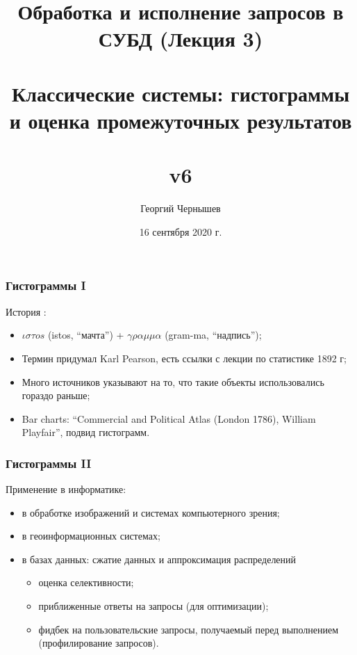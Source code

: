 \documentclass{beamer}
\title[Обработка и исполнение запросов: лекция 3]{Обработка и исполнение запросов в СУБД (Лекция 3) \\~\\ Классические системы: гистограммы и оценка промежуточных результатов\\~\\ v6} %
\author{Георгий Чернышев} %
\institute[ВШЭ] %
{
Высшая Школа Экономики \\ %
\medskip
\textit{chernishev@gmail.com} %
}
\date{16 сентября 2020 г.}
\begin{document}
\begin{frame}
\titlepage %
\end{frame}

\begin{frame}
\frametitle{Гистограммы I}

История \cite{Ioannidis2003}:
\begin{itemize}
  \setlength\itemsep{1em}
  \item $\iota \sigma \tau os$ (istos, ``мачта'') + $\gamma \rho \alpha \mu \mu \alpha$ (gram-ma, ``надпись'');
  \item Термин придумал Karl Pearson, есть ссылки с лекции по статистике 1892 г;
  \item Много источников указывают на то, что такие объекты использовались гораздо раньше;
  \item Bar charts: ``Commercial and Political Atlas (London 1786), William Playfair'', подвид гистограмм.
\end{itemize}

\end{frame}

\begin{frame}
\frametitle{Гистограммы II}

Применение в информатике:
\begin{itemize}
  \setlength\itemsep{1em}
  \item в обработке изображений и системах компьютерного зрения;
  \item в геоинформационных системах;
  \item в базах данных: сжатие данных и аппроксимация распределений
  \begin{itemize}
    \item оценка селективности;
    \item приближенные ответы на запросы (для оптимизации);
    \item фидбек на пользовательские запросы, получаемый перед выполнением (профилирование запросов).
  \end{itemize}  
\end{itemize}

\end{frame}
\end{document}
